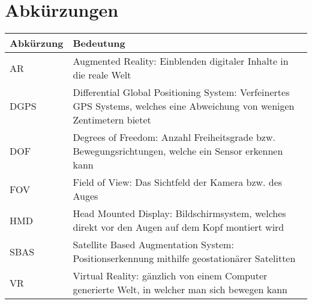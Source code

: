 \chapter*{Abk\"urzungen}\label{c.abk}
\vspace{-20pt}
\begin{flushleft}\begin{tabularx}{\textwidth}{l|X}
Abk\"urzung & Bedeutung\\\hline
AR & Augmented Reality: Einblenden digitaler Inhalte in die reale Welt\\
DGPS & Differential Global Positioning System: Verfeinertes GPS Systems, welches eine Abweichung von wenigen Zentimetern bietet\\
DOF & Degrees of Freedom: Anzahl Freiheitsgrade bzw. Bewegungsrichtungen, welche ein Sensor erkennen kann\\
FOV & Field of View: Das Sichtfeld der Kamera bzw. des Auges\\
HMD & Head Mounted Display: Bildschirmsystem, welches direkt vor den Augen auf dem Kopf montiert wird\\
SBAS & Satellite Based Augmentation System: Positionserkennung mithilfe geostationärer Satelitten\\
VR & Virtual Reality: gänzlich von einem Computer generierte Welt, in welcher man sich bewegen kann\\
\end{tabularx}\end{flushleft}


